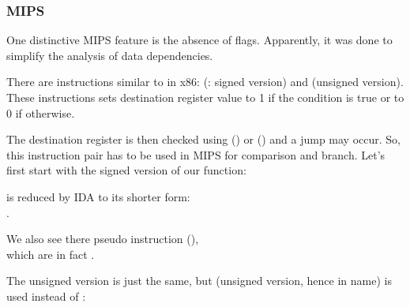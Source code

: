 ﻿\subsubsection{MIPS}

One distinctive MIPS feature is the absence of flags.
Apparently, it was done to simplify the analysis of data dependencies.


There are instructions similar to  in x86:  (: signed version) and 
 (unsigned version).
These instructions sets destination register value to 1 if the condition is true or to 0 if otherwise.


The destination register is then checked using  () or  () 
and a jump may occur.
So, this instruction pair has to be used in MIPS for comparison and branch.
Let's first start with the signed version of our function:



 is reduced by IDA to its 
shorter form:\\
.

We also see there  pseudo instruction (),\\
which are in fact .


The unsigned version is just the same, but  (unsigned version, hence  in name) is used instead of :



